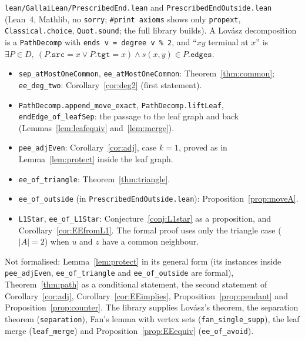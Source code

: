 \documentclass[11pt]{amsart}
\theoremstyle{definition}
\begin{document}
\texttt{lean/GallaiLean/PrescribedEnd.lean} and \texttt{PrescribedEndOutside.lean} (Lean~4, Mathlib,
no \texttt{sorry}; \texttt{\#print axioms} shows only \texttt{propext}, \texttt{Classical.choice},
\texttt{Quot.sound}; the full library builds). A Lov\'asz decomposition is a \texttt{PathDecomp} with \texttt{ends v = degree v \% 2}, and
``$xy$ terminal at $x$'' is $\exists P\in D,\ (P.\mathtt{src}=x\lor P.\mathtt{tgt}=x)\land
s(x,y)\in P.\mathtt{edges}$.
\begin{itemize}
\item \texttt{sep\_atMostOneCommon}, \texttt{ee\_atMostOneCommon}: Theorem~\ref{thm:common};
\texttt{ee\_deg\_two}: Corollary~\ref{cor:deg2} (first statement).
\item \texttt{PathDecomp.append\_move\_exact}, \texttt{PathDecomp.liftLeaf},
\texttt{endEdge\_of\_leafSep}: the passage to the leaf graph and back (Lemmas~\ref{lem:leafequiv}
and~\ref{lem:merge}).
\item \texttt{pee\_adjEven}: Corollary~\ref{cor:adj}, case $k=1$, proved as in Lemma~\ref{lem:protect}
inside the leaf graph.
\item \texttt{ee\_of\_triangle}: Theorem~\ref{thm:triangle}.
\item \texttt{ee\_of\_outside} (in \texttt{PrescribedEndOutside.lean}): Proposition~\ref{prop:moveA}.
\item \texttt{L1Star}, \texttt{ee\_of\_L1Star}: Conjecture~\ref{conj:L1star} as a proposition, and
Corollary~\ref{cor:EEfromL1}. The formal proof uses only the triangle case ($|A|=2$) when $u$ and $z$
have a common neighbour.
\end{itemize}
Not formalised: Lemma~\ref{lem:protect} in its general form (its instances inside
\texttt{pee\_adjEven}, \texttt{ee\_of\_triangle} and \texttt{ee\_of\_outside} are formal),
Theorem~\ref{thm:path} as a conditional statement, the second statement of Corollary~\ref{cor:adj},
Corollary~\ref{cor:EEimplies}, Proposition~\ref{prop:pendant} and Proposition~\ref{prop:counter}. The library supplies Lov\'asz's theorem, the
separation theorem (\texttt{separation}), Fan's lemma with vertex sets (\texttt{fan\_single\_supp}),
the leaf merge (\texttt{leaf\_merge}) and Proposition~\ref{prop:EEequiv} (\texttt{ee\_of\_avoid}).
\end{document}
